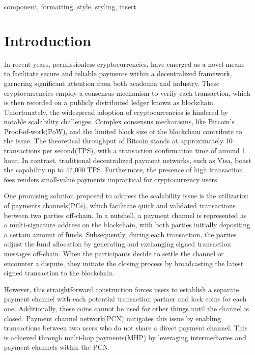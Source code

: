 \documentclass[conference]{IEEEtran}
\begin{document}
\begin{IEEEkeywords}
component, formatting, style, styling, insert
\end{IEEEkeywords}

\section{Introduction}
In recent years, permissionless cryptocurrencies, have emerged as a novel means to facilitate secure
and reliable payments within a decentralized framework, garnering significant attention from both academia and industry. 
These cryptocurrencies employ a consensus mechanism to verify each transaction, which is
then recorded on a publicly distributed ledger known as blockchain. Unfortunately, 
the widespread adoption of cryptocurrencies is hindered by notable scalability challenges. Complex consensus mechanisms, like Bitcoin's Proof-of-work(PoW), 
and the limited block size of the blockchain contribute to the issue. The theoretical
throughput of Bitcoin stands at approximately 10 transactions per second(TPS), with a transaction confirmation time of 
around 1 hour. In contrast, traditional decentralized payment networks, 
such as Visa, boast the capability up to 47,000 TPS. Furthermore, the presence of high transaction fees renders small-value 
payments impractical for cryptocurrency users.

One promising solution proposed to address the scalability issue is the utilization of payments channels(PCs), which
facilitate quick and validated transactions between two parties off-chain. In a nutshell, a payment channel 
is represented as a multi-signature address on the blockchain, with both parties initially
depositing a certain amount of funds. Subsequently, during each transaction, the parties adjust the fund allocation by 
generating and exchanging signed transaction messages off-chain. When the participants decide to settle the 
channel or encounter a dispute, they initiate the closing process by broadcasting the latest signed transaction
to the blockchain. 

However, this straightforward construction forces users to establish a separate payment channel with each
potential transaction partner and lock coins for each one. Additionally, these coins cannot be used for other
things until the channel is closed. Payment channel network(PCN) mitigates this issue by enabling transactions between two users who do not share a
direct payment channel. This is achieved through multi-hop payments(MHP) by leveraging intermediaries
and payment channels within the PCN. 
\end{document}
